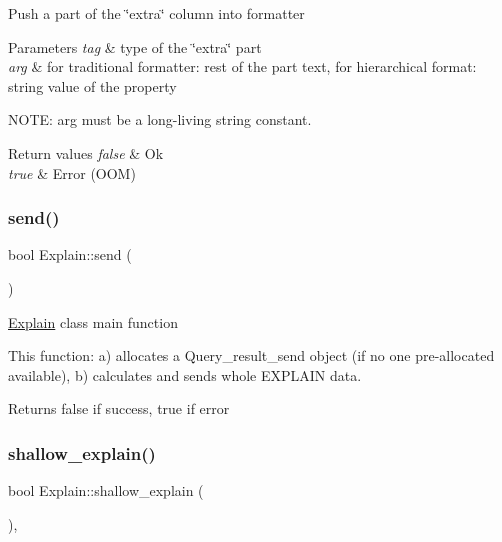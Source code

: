 Push a part of the \char`\"{}extra\char`\"{} column into formatter


\begin{DoxyParams}{Parameters}
{\em tag} & type of the \char`\"{}extra\char`\"{} part \\
\hline
{\em arg} & for traditional formatter\+: rest of the part text, for hierarchical format\+: string value of the property\\
\hline
\end{DoxyParams}
N\+O\+TE\+: arg must be a long-\/living string constant.


\begin{DoxyRetVals}{Return values}
{\em false} & Ok \\
\hline
{\em true} & Error (O\+OM) \\
\hline
\end{DoxyRetVals}
\mbox{\label{classExplain_ad8b4ddd375a711b59d6d9b50d84f2cf2}} 
\subsubsection{\texorpdfstring{send()}{send()}}
{\footnotesize\ttfamily bool Explain\+::send (\begin{DoxyParamCaption}{ }\end{DoxyParamCaption})}

\mbox{\hyperlink{classExplain}{Explain}} class main function

This function\+: a) allocates a Query\+\_\+result\+\_\+send object (if no one pre-\/allocated available), b) calculates and sends whole E\+X\+P\+L\+A\+IN data.

\begin{DoxyReturn}{Returns}
false if success, true if error 
\end{DoxyReturn}
\mbox{\label{classExplain_a2b5b074864b25d4bb669047dbcae8abb}} 
\subsubsection{\texorpdfstring{shallow\+\_\+explain()}{shallow\_explain()}}
{\footnotesize\ttfamily bool Explain\+::shallow\+\_\+explain (\begin{DoxyParamCaption}{ }\end{DoxyParamCaption})\hspace{0.3cm}{\ttfamily [protected]}, {\ttfamily [virtual]}}

